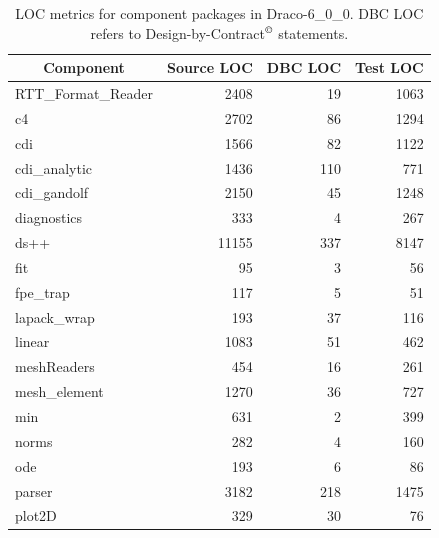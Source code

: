\documentclass[note]{ResearchNote}
\newcommand{\draco}{Draco}
\newcommand{\dracor}{\draco-6\_0\_0}
\begin{document}
\begin{table}
  \caption{
    LOC metrics for component packages in \dracor.  DBC LOC refers to
    Design-by-Contract$^{\copyright}$ statements. 
  }
  \label{tab:loc}
  \begin{center}
    \begin{tabular}{lrrr}\hline\hline
      \multicolumn{1}{c}{Component} &
      \multicolumn{1}{c}{Source LOC} &
      \multicolumn{1}{c}{DBC LOC} &
      \multicolumn{1}{c}{Test LOC} \\\hline
      RTT\_Format\_Reader &     2408     &       19      &      1063     \\
      c4                 &      2702     &       86      &      1294     \\
      cdi                &      1566     &       82      &      1122     \\
      cdi\_analytic      &      1436     &      110      &       771     \\
      cdi\_gandolf       &      2150     &       45      &      1248     \\
      diagnostics        &       333     &        4      &       267     \\
      ds++               &     11155     &      337      &      8147     \\
      fit                &        95     &        3      &        56     \\
      fpe\_trap          &       117     &        5      &        51     \\
      lapack\_wrap       &       193     &       37      &       116     \\
      linear             &      1083     &       51      &       462     \\
      meshReaders        &       454     &       16      &       261     \\
      mesh\_element      &      1270     &       36      &       727     \\
      min                &       631     &        2      &       399     \\
      norms              &       282     &        4      &       160     \\
      ode                &       193     &        6      &        86     \\
      parser             &      3182     &      218      &      1475     \\
      plot2D             &       329     &       30      &        76     \\

\end{tabular}
\end{center}
\end{table}
\end{document}
